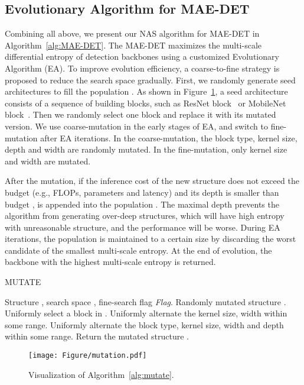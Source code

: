 \documentclass[nohyperref]{article}
\theoremstyle{plain}
\theoremstyle{definition}
\theoremstyle{remark}
\begin{document}
\subsection{Evolutionary Algorithm for MAE-DET}

Combining all above, we present our NAS algorithm for MAE-DET in Algorithm~\ref{alg:MAE-DET}. The MAE-DET maximizes the multi-scale differential entropy of detection backbones using a customized Evolutionary Algorithm (EA). To improve evolution efficiency, a coarse-to-fine strategy is proposed to reduce the search space gradually. First, we randomly generate  seed architectures to fill the population . As shown in Figure~\ref{fig:block}, a seed architecture  consists of a sequence of building blocks, such as ResNet block~\citep{resnet} or MobileNet block~\citep{mbv2}. Then we randomly select one block and replace it with its mutated version. We use coarse-mutation in the early stages of EA, and switch to fine-mutation after  EA iterations.  In the coarse-mutation, the block type, kernel size, depth and width are randomly mutated. In the fine-mutation, only kernel size and width are mutated.

After the mutation, if the inference cost of the new structure  does not exceed the budget (e.g., FLOPs, parameters and latency) and its depth is smaller than budget ,  is appended into the population . The maximal depth  prevents the algorithm from generating over-deep structures, which will have high entropy with unreasonable structure, and the performance will be worse. During EA iterations, the population is maintained to a certain size by discarding the worst candidate of the smallest multi-scale entropy. At the end of evolution, the backbone with the highest multi-scale entropy is returned.

\begin{algorithm}[H]
	\caption{MUTATE}
	\label{alg:mutate}
	\begin{algorithmic}[1]
		\REQUIRE Structure , search space , fine-search flag \textit{Flag}. 
		\ENSURE Randomly mutated structure .
		\STATE Uniformly select a block  in .
		\STATE Uniformly alternate the kernel size, width within some range.
		\ELSE
		\STATE Uniformly alternate the block type, kernel size, width and depth within some range.
		\ENDIF
		\STATE Return the mutated structure .
	\end{algorithmic}
\end{algorithm}

\begin{figure}[H]
	\centering
	\vspace{-0.5cm}
	\texttt{[image: Figure/mutation.pdf]}			
	\caption{Visualization of Algorithm~\ref{alg:mutate}.}
	\label{fig:block}			
\end{figure}
\end{document}
